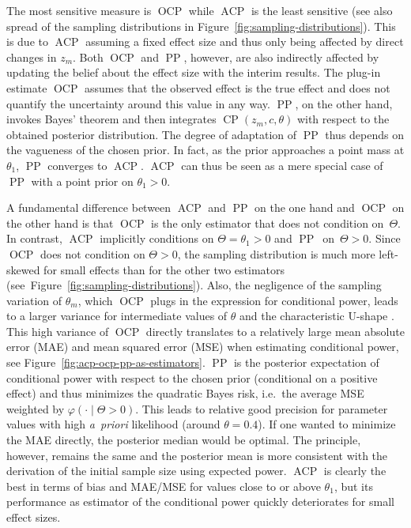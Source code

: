 \documentclass[12pt]{article}
\newcommand{\CP}{\ensuremath{\operatorname{CP}}}
\newcommand{\ACP}{\ensuremath{\operatorname{ACP}}}
\newcommand{\OCP}{\ensuremath{\operatorname{OCP}}}
\newcommand{\PP}{\ensuremath{\operatorname{PP}}}
\begin{document}
The most sensitive measure is $\OCP$ while $\ACP$ is the least sensitive
(see also spread of the sampling distributions in Figure~\ref{fig:sampling-distributions}).
This is due to $\ACP$ assuming a fixed effect size and thus
only being affected by direct changes in $z_m$.
Both $\OCP$ and $\PP$, however, are also indirectly affected by updating
the belief about the effect size with the interim results.
The plug-in estimate $\OCP$ assumes that the observed effect is the
true effect and does not quantify the uncertainty around this value in any way.
$\PP$, on the other hand, invokes Bayes' theorem and then integrates
$\CP(z_m,c,\theta)$ with respect to the obtained posterior distribution.
The degree of adaptation of $\PP$ thus depends
on the vagueness of the chosen prior.
In fact, as the prior approaches a point mass at $\theta_1$, $\PP$ converges
to $\ACP$.
$\ACP$ can thus be seen as a mere special case of $\PP$ with a point prior
on $\theta_1>0$.

A fundamental difference between $\ACP$ and $\PP$ on the one hand and $\OCP$ on the other hand is that
$\OCP$ is the only estimator that does not condition on~$\Theta$.
In contrast, $\ACP$ implicitly conditions on $\Theta=\theta_1>0$ and
$\PP$~on~${\Theta > 0}$.
Since $\OCP$ does not condition on $\Theta>0$, the sampling distribution is much more left-skewed for small effects than for the other two estimators (see~Figure~\ref{fig:sampling-distributions}).
Also, the negligence of the sampling variation of $\widehat{\theta}_m$, which $\OCP$ plugs in the expression for conditional power, leads to a larger variance for intermediate values of $\theta$ and the characteristic
U-shape \cite{bauer2006}.
This high variance of $\OCP$ directly translates to a relatively large mean absolute error (MAE) and mean squared error (MSE) when estimating conditional power,
see Figure~\ref{fig:acp-ocp-pp-as-estimators}.
$\PP$ is the posterior expectation of conditional power with respect to the chosen prior (conditional on a positive effect) and thus  minimizes the quadratic Bayes risk, i.e.~the average MSE weighted by $\varphi(\cdot\mid\Theta>0)$.
This leads to relative good precision for parameter values with high \textit{a~priori} likelihood
(around $\theta=0.4$).
If one wanted to minimize the MAE directly,
the posterior median would be optimal.
The principle, however, remains the same and
the posterior mean is more consistent with the derivation of the initial sample size using expected power.
$\ACP$ is clearly the best in terms of bias and MAE/MSE for values close to or
above $\theta_1$, but its performance as estimator of the conditional power
quickly deteriorates for small effect sizes.
\end{document}
